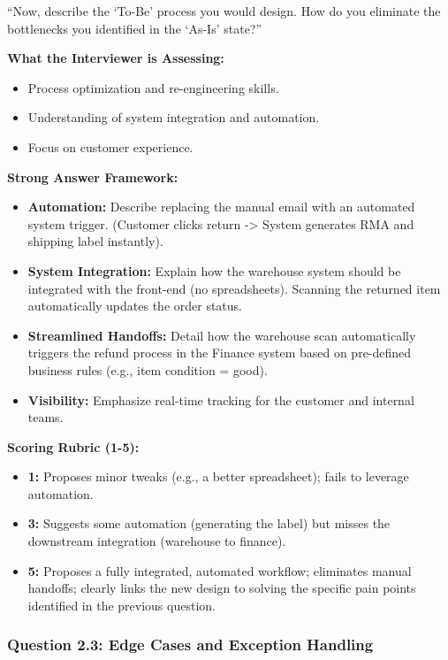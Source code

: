 \documentclass[
  11pt,
  openany,
  oneside]{book}
\providecommand{\tightlist}{%
  \setlength{\itemsep}{0pt}\setlength{\parskip}{0pt}}
\begin{document}
``Now, describe the `To-Be' process you would design. How do you
eliminate the bottlenecks you identified in the `As-Is' state?''

\textbf{What the Interviewer is Assessing:}

\begin{itemize}
\tightlist
\item
  Process optimization and re-engineering skills.
\item
  Understanding of system integration and automation.
\item
  Focus on customer experience.
\end{itemize}

\textbf{Strong Answer Framework:}

\begin{itemize}
\tightlist
\item
  \textbf{Automation:} Describe replacing the manual email with an
  automated system trigger. (Customer clicks return -\textgreater{}
  System generates RMA and shipping label instantly).
\item
  \textbf{System Integration:} Explain how the warehouse system should
  be integrated with the front-end (no spreadsheets). Scanning the
  returned item automatically updates the order status.
\item
  \textbf{Streamlined Handoffs:} Detail how the warehouse scan
  automatically triggers the refund process in the Finance system based
  on pre-defined business rules (e.g., item condition = good).
\item
  \textbf{Visibility:} Emphasize real-time tracking for the customer and
  internal teams.
\end{itemize}

\textbf{Scoring Rubric (1-5):}

\begin{itemize}
\tightlist
\item
  \textbf{1:} Proposes minor tweaks (e.g., a better spreadsheet); fails
  to leverage automation.
\item
  \textbf{3:} Suggests some automation (generating the label) but misses
  the downstream integration (warehouse to finance).
\item
  \textbf{5:} Proposes a fully integrated, automated workflow;
  eliminates manual handoffs; clearly links the new design to solving
  the specific pain points identified in the previous question.
\end{itemize}

\subsubsection{Question 2.3: Edge Cases and Exception
Handling}\label{question-2.3-edge-cases-and-exception-handling}
\end{document}
